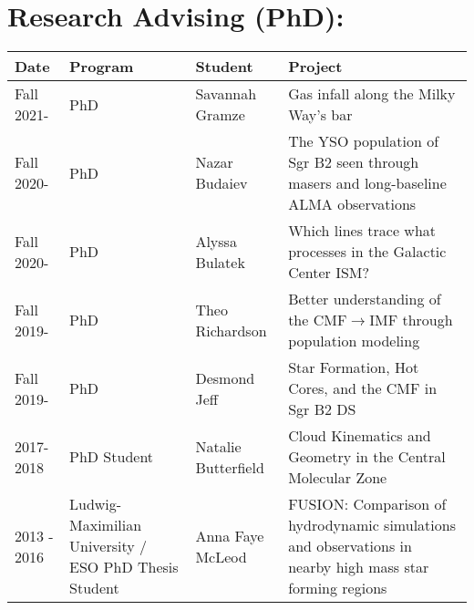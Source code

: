 \setlength{\extrarowheight}{4pt}
\section*{Research Advising (PhD): }
\vspace{-12pt}
\begin{tabular}{p{0.75in}p{1.3in}lp{2.6in}}
    Date  & Program & Student &  Project \\
    \hline
    Fall 2021- & PhD &                                         Savannah Gramze    &  Gas infall along the Milky Way's bar \\
    Fall 2020- & PhD &                                         Nazar Budaiev    & The YSO population of Sgr B2 seen through masers and long-baseline ALMA observations  \\
    Fall 2020- & PhD &                                         Alyssa Bulatek    & Which lines trace what processes in the Galactic Center ISM?  \\
    Fall 2019- & PhD &                                         Theo Richardson    & Better understanding of the CMF$\rightarrow$IMF through population modeling  \\
    Fall 2019- & PhD &                                         Desmond Jeff    &  Star Formation, Hot Cores, and the CMF in Sgr B2 DS \\
    2017-2018 & PhD Student &                                                        Natalie Butterfield &  Cloud Kinematics and Geometry in the Central Molecular Zone \\
    2013 - 2016 & Ludwig-Maximilian University / ESO PhD Thesis Student & Anna Faye McLeod &  FUSION: Comparison of hydrodynamic simulations and observations in nearby high mass star forming regions  \\
\end{tabular}


